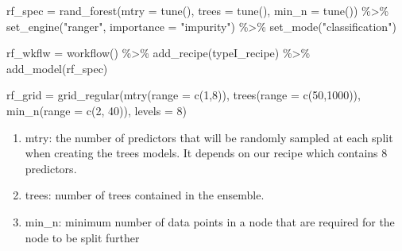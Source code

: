 \documentclass[
]{article}
\newenvironment{Shaded}{\begin{snugshade}}{\end{snugshade}}
\newcommand{\AttributeTok}[1]{\textcolor[rgb]{0.77,0.63,0.00}{#1}}
\newcommand{\DecValTok}[1]{\textcolor[rgb]{0.00,0.00,0.81}{#1}}
\newcommand{\FunctionTok}[1]{\textcolor[rgb]{0.00,0.00,0.00}{#1}}
\newcommand{\NormalTok}[1]{#1}
\newcommand{\OtherTok}[1]{\textcolor[rgb]{0.56,0.35,0.01}{#1}}
\newcommand{\SpecialCharTok}[1]{\textcolor[rgb]{0.00,0.00,0.00}{#1}}
\newcommand{\StringTok}[1]{\textcolor[rgb]{0.31,0.60,0.02}{#1}}
\begin{document}
\begin{Shaded}
\begin{Highlighting}[]
\NormalTok{rf\_spec }\OtherTok{=} \FunctionTok{rand\_forest}\NormalTok{(}\AttributeTok{mtry =} \FunctionTok{tune}\NormalTok{(), }\AttributeTok{trees =} \FunctionTok{tune}\NormalTok{(), }\AttributeTok{min\_n =} \FunctionTok{tune}\NormalTok{()) }\SpecialCharTok{\%\textgreater{}\%}
  \FunctionTok{set\_engine}\NormalTok{(}\StringTok{"ranger"}\NormalTok{, }\AttributeTok{importance =} \StringTok{"impurity"}\NormalTok{) }\SpecialCharTok{\%\textgreater{}\%}
  \FunctionTok{set\_mode}\NormalTok{(}\StringTok{"classification"}\NormalTok{)}
\end{Highlighting}
\end{Shaded}

\begin{Shaded}
\begin{Highlighting}[]
\NormalTok{rf\_wkflw }\OtherTok{=} \FunctionTok{workflow}\NormalTok{() }\SpecialCharTok{\%\textgreater{}\%} 
  \FunctionTok{add\_recipe}\NormalTok{(typeI\_recipe) }\SpecialCharTok{\%\textgreater{}\%}
  \FunctionTok{add\_model}\NormalTok{(rf\_spec)}
\end{Highlighting}
\end{Shaded}

\begin{Shaded}
\begin{Highlighting}[]
\NormalTok{rf\_grid }\OtherTok{=} \FunctionTok{grid\_regular}\NormalTok{(}\FunctionTok{mtry}\NormalTok{(}\AttributeTok{range =} \FunctionTok{c}\NormalTok{(}\DecValTok{1}\NormalTok{,}\DecValTok{8}\NormalTok{)), }
                       \FunctionTok{trees}\NormalTok{(}\AttributeTok{range =} \FunctionTok{c}\NormalTok{(}\DecValTok{50}\NormalTok{,}\DecValTok{1000}\NormalTok{)),}
                       \FunctionTok{min\_n}\NormalTok{(}\AttributeTok{range =} \FunctionTok{c}\NormalTok{(}\DecValTok{2}\NormalTok{, }\DecValTok{40}\NormalTok{)),}
                       \AttributeTok{levels =} \DecValTok{8}\NormalTok{)}
\end{Highlighting}
\end{Shaded}

\begin{enumerate}
\def\labelenumi{\arabic{enumi}.}
\item
  mtry: the number of predictors that will be randomly sampled at each
  split when creating the trees models. It depends on our recipe which
  contains 8 predictors.
\item
  trees: number of trees contained in the ensemble.
\item
  min\_n: minimum number of data points in a node that are required for
  the node to be split further
\end{enumerate}
\end{document}
